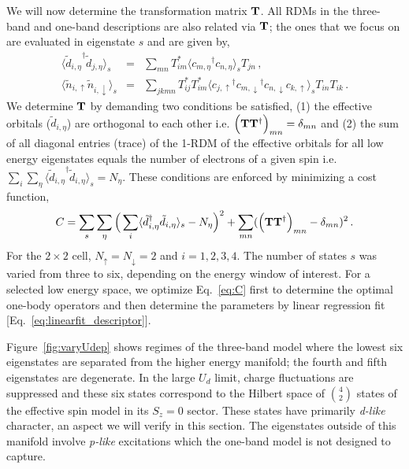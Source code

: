We will now determine the transformation matrix ${\bf T}$. All RDMs in the three-band and one-band descriptions are also related via ${\bf T}$; 
the ones that we focus on are evaluated in eigenstate $s$ and are given by,
\begin{subequations}
\begin{eqnarray}
	\langle {\tilde{d}_{i,\eta}}^{\dagger} \tilde{d}_{j,\eta} \rangle_{s} &=& \sum_{mn} T^{*}_{im} \langle {c_{m,\eta}}^{\dagger} c_{n,\eta} \rangle_{s} T_{jn} \label{eq:dmstransformations1} \,,\\
	\langle \tilde{n}_{i,\uparrow} \tilde{n}_{i,\downarrow} \rangle_{s} &=& \sum_{jkmn} T^{*}_{ij} T^{*}_{im} \langle {c_{j,\uparrow}}^{\dagger} {c_{m,\downarrow}}^{\dagger} c_{n,\downarrow} c_{k,\uparrow} \rangle_{s} T_{in} T_{ik}\,.
\label{eq:dmstransformations2}
\end{eqnarray}
\end{subequations}
We determine ${\bf T}$ by demanding two conditions be satisfied, (1) the effective orbitals ($\tilde{d}_{i,\eta}$) 
are orthogonal to each other i.e. $\Big({\bf T} {\bf T}^{\dagger}\Big)_{mn} = \delta_{mn}$
and (2) the sum of all diagonal entries (trace) of the 1-RDM of the effective orbitals for all low energy eigenstates 
equals the number of electrons of a given spin i.e. $\sum_{i} \sum_{\eta} \langle {\tilde{d}_{i,\eta}}^{\dagger} \tilde{d}_{i,\eta} \rangle_{s} = N_{\eta}$. 
These conditions are enforced by minimizing a cost function,
\begin{equation}
C = \sum_{s} \sum_{\eta} \Big( \sum_{i} \langle \tilde{d}_{i,\eta}^{\dagger} \tilde{d}_{i,\eta} \rangle_{s} - N_{\eta} \Big)^{2} + \sum_{mn} ( \Big({\bf T} {\bf T}^{\dagger}\Big)_{mn} -\delta_{mn})^{2}\,.
\label{eq:C}
\end{equation} 
For the $2\times2$ cell, $N_{\uparrow}=N_{\downarrow}=2$ and $i=1,2,3,4$. 
The number of states $s$ was varied from three to six, depending on the energy window of interest. For a selected low energy space, 
we optimize Eq.~\eqref{eq:C} first to determine the optimal one-body operators and then determine the parameters by linear regression fit [Eq.~\eqref{eq:linearfit_descriptor}].

Figure~\ref{fig:varyUdep} shows regimes of the three-band model where 
the lowest six eigenstates are separated from the higher energy manifold; the 
fourth and fifth eigenstates are degenerate. 
In the large $U_d$ limit, charge fluctuations are suppressed and these six 
states correspond to the Hilbert space of $4 \choose 2$ states of the effective spin model in its $S_z=0$ sector.
These states have primarily \textit{d-like} character, an aspect we will verify in this section. 
The eigenstates outside of this manifold involve \textit{p-like} excitations which the one-band model is not designed 
to capture. 

